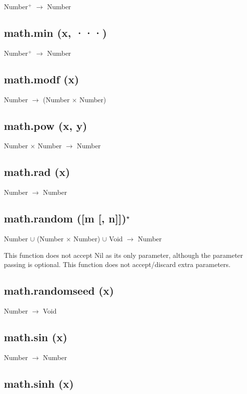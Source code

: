 \documentclass[12pt]{article}
\begin{document}
Number$^+$ $\rightarrow$ Number

\subsection{math.min (x, ···)}

Number$^+$ $\rightarrow$ Number

\subsection{math.modf (x)}

Number $\rightarrow$ (Number $\times$ Number)

\subsection{math.pow (x, y)}

Number $\times$ Number $\rightarrow$ Number

\subsection{math.rad (x)}

Number $\rightarrow$ Number

\subsection{math.random ([m [, n]])$^\star$}

Number $\cup$ (Number $\times$ Number) $\cup$ Void $\rightarrow$
Number

This function does not accept Nil as its only parameter,
although the parameter passing is optional.
This function does not accept/discard extra parameters.

\subsection{math.randomseed (x)}

Number $\rightarrow$ Void

\subsection{math.sin (x)}

Number $\rightarrow$ Number

\subsection{math.sinh (x)}
\end{document}
